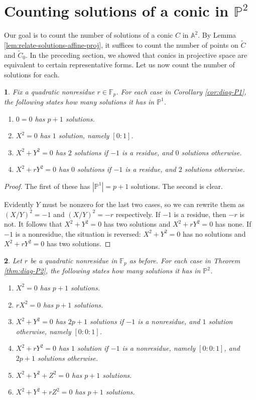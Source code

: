 \documentclass[10pt,a4paper]{amsart}
\numberwithin{equation}{section}
\numberwithin{figure}{section}
\theoremstyle{definition}
\theoremstyle{remark}
\theoremstyle{plain}
\theoremstyle{plain}
\theoremstyle{definition}
\theoremstyle{plain}
\newtheorem{prop}{\protect\propositionname}[section]
\theoremstyle{plain}
\providecommand{\propositionname}{Proposition}
\newcommand{\A}{\mathbb{A}}
\renewcommand{\P}{\mathbb{P}}
\newcommand{\F}{\mathbb{F}}
\begin{document}
    \section{Counting solutions of a conic in $\P^2$}\label{sec:proj-solutions}
	Our goal is to count the number of solutions of a conic $C$ in $\A^2$. By Lemma \ref{lem:relate-solutions-affine-proj}, it suffices to count the number of points on $\widetilde{C}$ and $\widetilde{C}_0$. In the preceding section, we showed that conics in projective space are equivalent to certain representative forms. Let us now count the number of solutions for each.
	\begin{prop}\label{prop:counting-P1-solutions}
		Fix a quadratic nonresidue $r \in \F_p$. For each case in Corollary \ref{cor:diag-P1}, the following states how many solutions it has in $\P^1$.
		\begin{enumerate} 
			\item $0 = 0$ has $p+1$ solutions.
			\item $X^2 = 0$ has $1$ solution, namely $[0:1]$.
			\item $X^2 + Y^2 = 0$ has $2$ solutions if $-1$ is a residue, and $0$ solutions otherwise. \label{case:x^2+y^2=0}
			\item $X^2 + rY^2 = 0$ has $0$ solutions if $-1$ is a residue, and $2$ solutions otherwise.
		\end{enumerate}
	\end{prop}
	\begin{proof}
		The first of these has $|\P^1| = p+1$ solutions. The second is clear.
		
		Evidently $Y$ must be nonzero for the last two cases, so we can rewrite them as
		$(X/Y)^2 = -1$ and $(X/Y)^2 = -r$ respectively. If $-1$ is a residue,
		then $-r$ is not. It follows that $X^2 + Y^2 = 0$ has two solutions and $X^2 +
		rY^2 = 0$ has none. If $-1$ is a nonresidue, the situation is reversed: $X^2 +
		Y^2 = 0$ has no solutions and $X^2 + rY^2 = 0$ has two solutions.
	\end{proof}
	\begin{prop}\label{prop:counting-P2-solutions}
		Let $r$ be a quadratic nonresidue in $\F_p$ as before. For each case in Theorem \ref{thm:diag-P2}, the following states how many solutions it has in $\P^2$. 
		\begin{enumerate} 
			\item\label{case:rank1_x^2=0} $X^2 = 0$ has $p+1$ solutions.
			\item\label{case:rank1_rx^2=0} $rX^2 = 0$ has $p+1$ solutions.
			\item\label{case:rank2_x^2+y^2=0} $X^2 + Y^2 = 0$ has $2p+1$ solutions if $-1$ is a nonresidue, and $1$ solution otherwise, namely $[0:0:1]$.
			\item\label{case:rank2_x^2+ry^2=0} $X^2 + rY^2 = 0$ has $1$ solution if $-1$ is a nonresidue, namely $[0:0:1]$, and $2p+1$ solutions otherwise.
			\item\label{case:rank3_x^2+y^2+z^2=0} $X^2 + Y^2 + Z^2 = 0$ has $p+1$ solutions.
			\item\label{case:rank3_x^2+y^2+rz^2=0} $X^2 + Y^2 + rZ^2 = 0$ has $p+1$ solutions.
		\end{enumerate}
	\end{prop}
\end{document}
